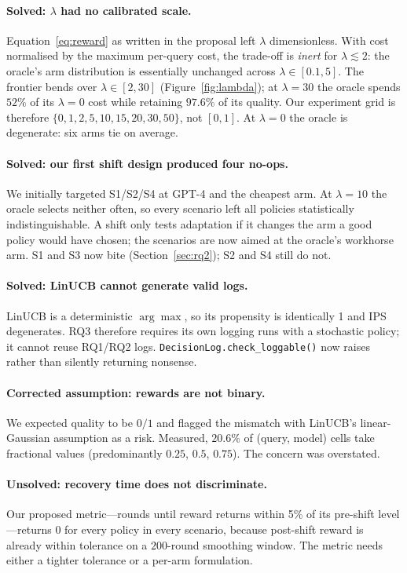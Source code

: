 \documentclass[10pt,twocolumn]{article}
\newcommand{\lam}{\lambda}
\begin{document}
\paragraph{Solved: $\lam$ had no calibrated scale.} Equation~\ref{eq:reward} as
written in the proposal left $\lam$ dimensionless. With cost normalised by the
maximum per-query cost, the trade-off is \emph{inert} for $\lam \lesssim 2$: the
oracle's arm distribution is essentially unchanged across $\lam \in [0.1, 5]$.
The frontier bends over $\lam \in [2,30]$ (Figure~\ref{fig:lambda}); at
$\lam=30$ the oracle spends $52\%$ of its $\lam{=}0$ cost while retaining
$97.6\%$ of its quality. Our experiment grid is therefore
$\{0,1,2,5,10,15,20,30,50\}$, not $[0,1]$. At $\lam=0$ the oracle is degenerate:
six arms tie on average.

\paragraph{Solved: our first shift design produced four no-ops.} We initially
targeted S1/S2/S4 at GPT-4 and the cheapest arm. At $\lam=10$ the oracle selects
neither often, so every scenario left all policies statistically
indistinguishable. A shift only tests adaptation if it changes the arm a good
policy would have chosen; the scenarios are now aimed at the oracle's workhorse
arm. S1 and S3 now bite (Section~\ref{sec:rq2}); S2 and S4 still do not.

\paragraph{Solved: LinUCB cannot generate valid logs.} LinUCB is a deterministic
$\arg\max$, so its propensity is identically 1 and IPS degenerates. RQ3
therefore requires its own logging runs with a stochastic policy; it cannot
reuse RQ1/RQ2 logs. \texttt{DecisionLog.check\_loggable()} now raises rather
than silently returning nonsense.

\paragraph{Corrected assumption: rewards are not binary.} We expected quality to
be $0/1$ and flagged the mismatch with LinUCB's linear-Gaussian assumption as a
risk. Measured, $20.6\%$ of (query, model) cells take fractional values
(predominantly $0.25$, $0.5$, $0.75$). The concern was overstated.

\paragraph{Unsolved: recovery time does not discriminate.} Our
proposed metric---rounds until reward returns within 5\% of its pre-shift
level---returns $0$ for every policy in every scenario, because post-shift
reward is already within tolerance on a $200$-round smoothing window. The metric
needs either a tighter tolerance or a per-arm formulation.
\end{document}
